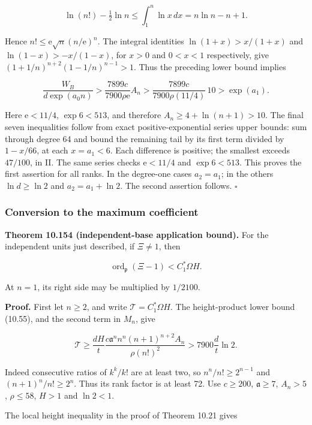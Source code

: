 \documentclass[
  11pt,
  a4paper,
]{article}
\begin{document}
\[
\ln(n!)-\tfrac12\ln n\le\int_1^n\ln x\,dx
=n\ln n-n+1.
\tag{10.461}
\]

Hence \(n!\le\mathrm e\sqrt n(n/\mathrm e)^n\). The integral identities
\(\ln(1+x)>x/(1+x)\) and \(\ln(1-x)>-x/(1-x)\), for \(x>0\) and
\(0<x<1\) respectively, give \((1+1/n)^{n+2}(1-1/n)^{n-1}>1\). Thus the
preceding lower bound implies

\[
\frac{W_B}{d\exp(a_0n)}
>\frac{7899c}{7900\rho\mathrm e}A_n
>\frac{7899c}{7900\rho(11/4)}\,10>\exp(a_1).
\tag{10.462}
\]

Here \(\mathrm e<11/4\), \(\exp6<513\), and therefore
\(A_n\ge4+\ln(n+1)>10\). The final seven inequalities follow from exact
positive-exponential series upper bounds: sum through degree 64 and
bound the remaining tail by its first term divided by \(1-x/66\), at
each \(x=a_1<6\). Each difference is positive; the smallest exceeds
\(47/100\), in II. The same series checks \(\mathrm e<11/4\) and
\(\exp6<513\). This proves the first assertion for all ranks. In the
degree-one cases \(a_2=a_1\); in the others \(\ln d\ge\ln2\) and
\(a_2=a_1+\ln2\). The second assertion follows. \(\square\)

\subsubsection{Conversion to the maximum
coefficient}\label{conversion-to-the-maximum-coefficient}

\textbf{Theorem 10.154 (independent-base application bound).} For the
independent units just described, if \(\Xi\ne1\), then

\[
\operatorname{ord}_{\mathfrak p}(\Xi-1)<C_1^*\Omega H.
\tag{10.463}
\]

At \(n=1\), its right side may be multiplied by \(1/2100\).

\textbf{Proof.} First let \(n\ge2\), and write
\(\mathcal T=C_1^*\Omega H\). The height-product lower bound (10.55),
and the second term in \(M_n\), give

\[
\mathcal T\ge\frac{dH}{t}
\frac{c\mathfrak a^n n^n(n+1)^{n+2}A_n}{\rho(n!)^2}
>7900\frac d t\ln2.
\tag{10.464}
\]

Indeed consecutive ratios of \(k^k/k!\) are at least two, so
\(n^n/n!\ge2^{n-1}\) and \((n+1)^n/n!\ge2^n\). Thus its rank factor is
at least 72. Use \(c\ge200\), \(\mathfrak a\ge7\), \(A_n>5\),
\(\rho\le58\), \(H>1\) and \(\ln2<1\).

The local height inequality in the proof of Theorem 10.21 gives
\end{document}
